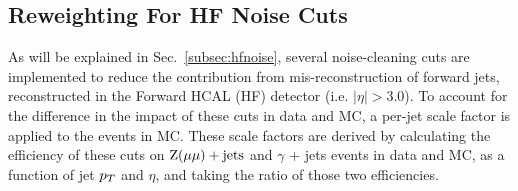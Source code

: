 



\subsection{Reweighting For HF Noise Cuts}
\label{subsec:hf_weighting}

As will be explained in Sec.~\ref{subsec:hfnoise}, several noise-cleaning cuts are implemented to reduce the contribution 
from mis-reconstruction of forward jets,
reconstructed in the Forward HCAL (HF) detector (i.e. $|\eta| > 3.0$). To account for the difference in the impact of these cuts in
data and MC, a per-jet scale factor is applied to the events in MC. These scale factors are derived by calculating the efficiency 
of these cuts on $\mathrm{Z}(\mu\mu)+\textrm{jets}$ and $\gamma$ + jets events in data and MC, as a function of jet $p_T$ and $\eta$, and taking 
the ratio of those two efficiencies. 

